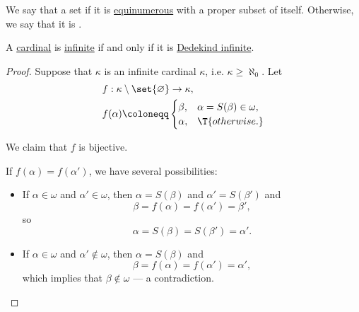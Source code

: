 \begin{definition}\label{def:dedekind_finiteness}
  We say that a set  if it is \hyperref[def:equinumerosity]{equinumerous} with a proper subset of itself. Otherwise, we say that it is .
\end{definition}

\begin{lemma}\label{thm:cardinal_infinite_iff_dedekind_infinite}
  A \hyperref[def:cardinal]{cardinal} is \hyperref[def:aleph_zero_related_cardinalities]{infinite} if and only if it is \hyperref[def:dedekind_finiteness]{Dedekind infinite}.
\end{lemma}
\begin{proof}
  \SufficiencySubProof Suppose that \( \kappa \) is an infinite cardinal \( \kappa \), i.e. \( \kappa \geq \aleph_0 \). Let
  \begin{equation*}
    \begin{aligned}
      &f: \kappa \setminus \set{ \varnothing } \to \kappa, \\
      &f(\alpha) \coloneqq \begin{cases}
        \beta,  &\alpha = S(\beta) \in \omega, \\
        \alpha, &\T{otherwise.} \\
      \end{cases}
    \end{aligned}
  \end{equation*}

  We claim that \( f \) is bijective.

   If \( f(\alpha) = f(\alpha') \), we have several possibilities:
  \begin{itemize}
    \item If \( \alpha \in \omega \) and \( \alpha' \in \omega \), then \( \alpha = S(\beta) \) and \( \alpha' = S(\beta') \) and
    \begin{equation*}
      \beta = f(\alpha) = f(\alpha') = \beta',
    \end{equation*}
    so
    \begin{equation*}
      \alpha = S(\beta) = S(\beta') = \alpha'.
    \end{equation*}

    \item If \( \alpha \in \omega \) and \( \alpha' \not\in \omega \), then \( \alpha = S(\beta) \) and
    \begin{equation*}
      \beta = f(\alpha) = f(\alpha') = \alpha',
    \end{equation*}
    which implies that \( \beta \not\in \omega \) --- a contradiction.


\end{itemize}
\end{proof}
